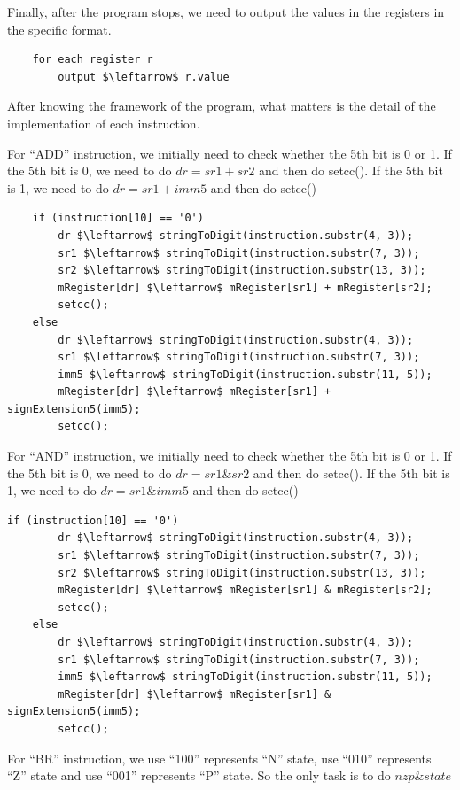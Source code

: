 \documentclass[twoside]{article}
\begin{document}
\begin{CJK*}{UTF8}{gbsn}
	Finally, after the program stops, we need to output the values in the registers in the specific format.
	\begin{lstlisting}
	for each register r 
		output $\leftarrow$ r.value
	\end{lstlisting}

	After knowing the framework of the program, what matters is the detail of the implementation of each instruction.
	
	For ``ADD'' instruction, we initially need to check whether the 5th bit is 0 or 1. If the 5th bit is 0, we need to do $dr = sr1 + sr2$ and then do setcc(). If the 5th bit is 1, we need to do $dr = sr1 + imm5$ and then do setcc()
	
	\begin{lstlisting}
	if (instruction[10] == '0') 
		dr $\leftarrow$ stringToDigit(instruction.substr(4, 3));
		sr1 $\leftarrow$ stringToDigit(instruction.substr(7, 3));
		sr2 $\leftarrow$ stringToDigit(instruction.substr(13, 3));
		mRegister[dr] $\leftarrow$ mRegister[sr1] + mRegister[sr2];
		setcc();
	else 
		dr $\leftarrow$ stringToDigit(instruction.substr(4, 3));
		sr1 $\leftarrow$ stringToDigit(instruction.substr(7, 3));
		imm5 $\leftarrow$ stringToDigit(instruction.substr(11, 5));
		mRegister[dr] $\leftarrow$ mRegister[sr1] + signExtension5(imm5);
		setcc();
	\end{lstlisting}

	For ``AND'' instruction, we initially need to check whether the 5th bit is 0 or 1. If the 5th bit is 0, we need to do $dr = sr1 \& sr2$ and then do setcc(). If the 5th bit is 1, we need to do $dr = sr1 \& imm5$ and then do setcc()
	
	
	
	\begin{lstlisting}[mathescape=true]
	if (instruction[10] == '0') 
		dr $\leftarrow$ stringToDigit(instruction.substr(4, 3));
		sr1 $\leftarrow$ stringToDigit(instruction.substr(7, 3));
		sr2 $\leftarrow$ stringToDigit(instruction.substr(13, 3));
		mRegister[dr] $\leftarrow$ mRegister[sr1] & mRegister[sr2];
		setcc();
	else 
		dr $\leftarrow$ stringToDigit(instruction.substr(4, 3));
		sr1 $\leftarrow$ stringToDigit(instruction.substr(7, 3));
		imm5 $\leftarrow$ stringToDigit(instruction.substr(11, 5));
		mRegister[dr] $\leftarrow$ mRegister[sr1] & signExtension5(imm5);
		setcc();	
	\end{lstlisting}

	For ``BR'' instruction, we use ``100'' represents ``N'' state, use ``010'' represents ``Z'' state and use ``001'' represents ``P'' state. So the only task is to do $ nzp \& state $


\end{CJK*}
\end{document}
